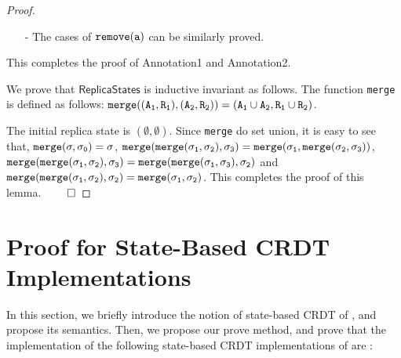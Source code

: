 \begin {proof}
\begin{itemize}
\begin{itemize}
    \item[-] If $\alabel \notin \alabelset_S$: Let $\alabelset'_S$ be the $\alabelset$ of $S'$. We can see that, $\alabelset'_S = \alabelset_S \cup \alabel \cup \avisord^{-1}(\alabel)$. By Annotation1 of $(A'',R'')$ and Annotation2 of $S$, we can see that Annotation2 holds for $S'$.
    \end{itemize}

\item[-] The cases of $\alabelshort[{\tt remove}]{a}$ can be similarly proved.
\end{itemize}

This completes the proof of Annotation1 and Annotation2.

We prove that $\mathsf{ReplicaStates}$ is inductive invariant as follows. The function {\tt merge} is defined as follows: $\alabelshort[{\tt merge}]{(A_1,R_1),(A_2,R_2)} = (A_1 \cup A_2, R_1 \cup R_2)$.

The initial replica state is $(\emptyset,\emptyset)$. Since {\tt merge} do set union, it is easy to see that, $\alabelshort[{\tt merge}]{\astate,\astate_0} = \astate$, $\alabelshort[{\tt merge}]{\alabelshort[{\tt merge}]{\astate_1,\astate_2},\astate_3} = \alabelshort[{\tt merge}]{\astate_1, \alabelshort[{\tt merge}]{\astate_2,\astate_3}}$, $\alabelshort[{\tt merge}]{\alabelshort[{\tt merge}]{\astate_1,\astate_2},\astate_3} = \alabelshort[{\tt merge}]{\alabelshort[{\tt merge}]{\astate_1,\astate_3},\astate_2}$ and $\alabelshort[{\tt merge}]{\alabelshort[{\tt merge}]{\astate_1,\astate_2},\astate_2} = \alabelshort[{\tt merge}]{\astate_1,\astate_2}$. This completes the proof of this lemma. $\qed$
\end {proof}









\section{\crdtlin{} Proof for State-Based CRDT Implementations}
\label{sec:RA-linearizability proof for state-based CRDT implementations}

In this section, we briefly introduce the notion of state-based CRDT of \cite{ShapiroPBZ11}, and propose its semantics. Then, we propose our prove method, and prove that the implementation of the following state-based CRDT implementations of \cite{ShapiroPBZ11} are \crdtlinearizable{}:

